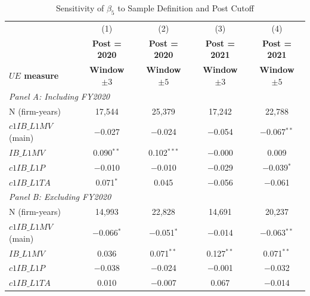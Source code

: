 \documentclass[12pt]{article}
\begin{document}
\clearpage

 \begin{table}[ht]
\centering
\caption{Sensitivity of $\beta_5$ to Sample Definition and Post Cutoff}
\label{tab:robust}
\small
\begin{threeparttable}
\begin{tabular}{lcccc}
\toprule
 & (1) & (2) & (3) & (4) \\
 & \textbf{Post = 2020} & \textbf{Post = 2020} & \textbf{Post = 2021} & \textbf{Post = 2021} \\
\textbf{$UE$ measure} & \textbf{Window $\pm 3$} & \textbf{Window $\pm 5$} & \textbf{Window $\pm 3$} & \textbf{Window $\pm 5$} \\
\midrule
\multicolumn{5}{l}{\textit{Panel A: Including FY2020}} \\
\midrule
N (firm-years) & 17{,}544 & 25{,}379 & 17{,}242 & 22{,}788 \\
$c1IB\_L1MV$ (main) & $-$0.027        & $-$0.024       & $-$0.054      & $-$0.067$^{**}$ \\
$IB\_L1MV$          &  0.090$^{**}$   &  0.102$^{***}$ & $-$0.000      &  0.009          \\
$c1IB\_L1P$         & $-$0.010        & $-$0.010       & $-$0.029      & $-$0.039$^{*}$  \\
$c1IB\_L1TA$        &  0.071$^{*}$    &  0.045         & $-$0.056      & $-$0.061        \\
\midrule
\multicolumn{5}{l}{\textit{Panel B: Excluding FY2020}} \\
\midrule
N (firm-years) & 14{,}993 & 22{,}828 & 14{,}691 & 20{,}237 \\
$c1IB\_L1MV$ (main) & $-$0.066$^{*}$  & $-$0.051$^{*}$ & $-$0.014      & $-$0.063$^{**}$ \\
$IB\_L1MV$          &  0.036          &  0.071$^{**}$  &  0.127$^{**}$ &  0.071$^{**}$   \\
$c1IB\_L1P$         & $-$0.038        & $-$0.024       & $-$0.001      & $-$0.032        \\
$c1IB\_L1TA$        &  0.010          & $-$0.007       &  0.067        & $-$0.014        \\
\bottomrule
\end{tabular}
\begin{tablenotes}
\footnotesize

\end{tablenotes}
\end{threeparttable}
\end{table}
\end{document}
